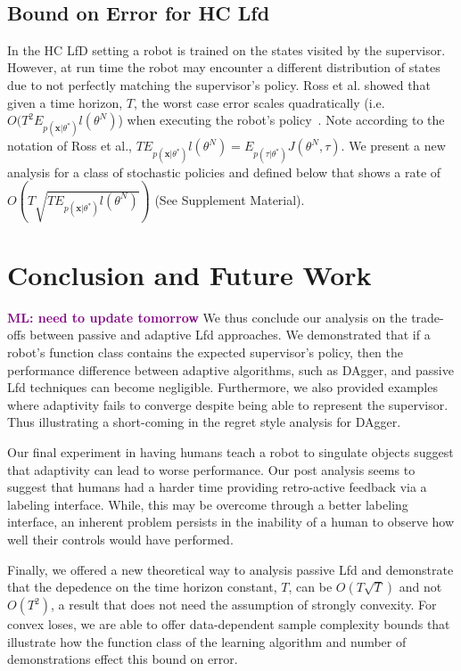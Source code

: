 \documentclass[10pt, conference]{ieeeconf}      %
\newcommand{\bx}{\mathbf{x}}
\newcommand{\mlnote}[1]{\ifthenelse{ \boolean{include-notes}}%
 {\textcolor{purple}{\textbf{ML: #1}}}{}}
\begin{document}
\
\subsection{Bound on Error for HC Lfd}
In the HC LfD setting a robot is trained on the states visited by the supervisor. However, at run time the robot may encounter a different distribution of states due to not perfectly matching the supervisor's policy. Ross et al. showed that given a time horizon, $T$, the worst case error scales quadratically (i.e. $O(T^2E_{p(\bx|\theta^*)} l(\theta^N)$) when executing the robot's policy~\cite{ross2010efficient}. Note according to the notation of Ross et al., $TE_{p(\bx|\theta^*)} l(\theta^N) = E_{p(\tau|\theta^*)} J(\theta^N, \tau)$. We present a new analysis for a class of stochastic policies and  defined below that shows a rate of $O(T\sqrt{TE_{p(\bx|\theta^*)} l(\theta^N)})$ (See Supplement Material). 


\section{Conclusion and Future Work}
\mlnote{need to update tomorrow}
We thus conclude our analysis on the trade-offs between passive and adaptive Lfd approaches. We demonstrated that if a robot's function class contains the expected supervisor's policy, then the  performance difference between adaptive algorithms, such as DAgger,  and passive Lfd techniques can become negligible.  Furthermore, we also provided examples where adaptivity fails to converge despite being able to represent the supervisor. Thus illustrating a short-coming in the regret style analysis for DAgger. 

Our final experiment in having humans teach a robot to singulate objects suggest that adaptivity can lead to worse performance. Our post analysis seems to suggest that humans had a harder time providing retro-active feedback via a labeling interface. While, this may be overcome through a better labeling interface, an inherent problem persists in the inability of a human to observe how well their controls would have performed. 

Finally, we offered a new theoretical  way to analysis passive Lfd and demonstrate that the depedence on the time horizon constant, $T$, can be $O(T\sqrt{T})$ and not $O(T^2)$, a result that does not need the assumption of strongly convexity.  For convex loses, we are able to offer data-dependent sample complexity bounds that illustrate how the function class of the learning algorithm and number of demonstrations effect this bound on error. 
\end{document}
